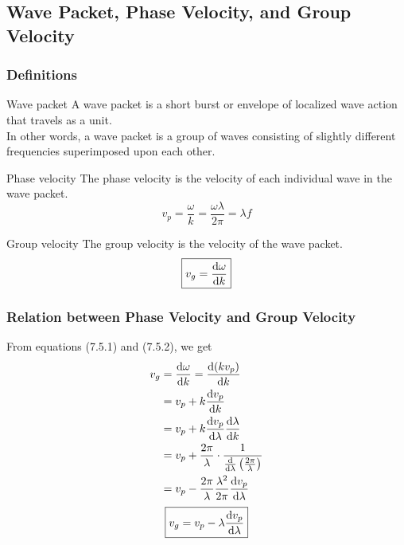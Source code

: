 \documentclass[12pt]{article}
\numberwithin{equation}{subsection}
\begin{document}
\subsection{Wave Packet, Phase Velocity, and Group Velocity}
\subsubsection{Definitions}
\begin{definition}{Wave packet}{}
    A wave packet is a short burst or envelope of localized wave action that travels as a unit. \\
    In other words, a wave packet is a group of waves consisting of slightly different frequencies superimposed upon each other.
\end{definition}

\begin{definition}{Phase velocity}{}
    The phase velocity is the velocity of each individual wave in the wave packet.
    \begin{equation}
        \boxed{ v_p = \frac{\omega}{k} = \frac{\omega\lambda}{2\pi} = \lambda f }
    \end{equation}
\end{definition}

\begin{definition}{Group velocity}{}
    The group velocity is the velocity of the wave packet.
    \begin{equation}
        \boxed{ v_g = \dv{\omega}{k} }
    \end{equation}
\end{definition}

\subsubsection{Relation between Phase Velocity and Group Velocity}
From equations (7.5.1) and (7.5.2), we get
\begin{align*}
    v_g &= \dv{\omega}{k} = \dv{(k v_p)}{k} \\
    &= v_p + k \dv{v_p}{k} \\
    &= v_p + k \dv{v_p}{\lambda} \dv{\lambda}{k} \\
    &= v_p + \frac{2\pi}{\lambda} \cdot \frac{1}{\dv{}{\lambda} \left( \frac{2\pi}{\lambda} \right)} \\
    &= v_p - \frac{2\pi}{\lambda}\frac{\lambda^2}{2\pi}\dv{v_p}{\lambda}
\end{align*}
\begin{equation}
    \boxed{ v_g = v_p - \lambda \dv{v_p}{\lambda} }
\end{equation}
\end{document}
